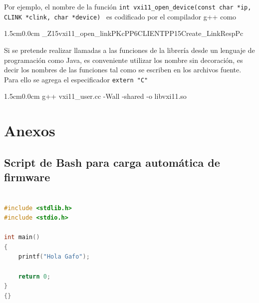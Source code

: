 \documentclass[paper=letter,oneside,fontsize=11pt, parskip=full]{scrartcl}
\newenvironment{code}
	{\begin{adjustwidth}{1.5cm}{0.0cm}\ttfamily}
	{\end{adjustwidth}}
\begin{document}
	Por ejemplo, el nombre de la función \texttt{int	vxi11\_open\_device(const char *ip, CLINK *clink, char *device) } es codificado por el compilador g++ como 
	
	\begin{code}
		\_Z15vxi11\_open\_linkPKcPP6CLIENTPP15Create\_LinkRespPc	
	\end{code}

	Si se pretende realizar llamadas a las funciones de la librería desde un lenguaje de programación como Java, es conveniente utilizar los nombre sin decoración, es decir los nombres de las funciones tal como se escriben en los archivos fuente. Para ello se agrega el especificador \texttt{extern "C"}
	

	\begin{code}
		g++ vxi11_user.cc  -Wall -shared -o libvxi11.so
	\end{code}
	
	

	

	
	
	
	
			
	\section{Anexos}	
		
		\subsection{Script de Bash para carga automática de firmware}
	
			\begin{lstlisting}[language=c,caption={Listado programa}]
	
#include <stdlib.h>
#include <stdio.h>

int main()
{
	printf("Hola Gafo");
	
	return 0;
}
{}
		\end{lstlisting}
\end{document}
